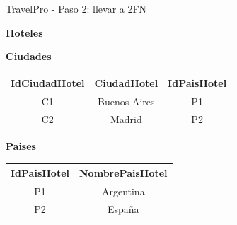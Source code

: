 \documentclass{beamer}
\begin{document}
\begin{frame}{TravelPro - Paso 2: llevar a 2FN}
    \begin{center}
    \textbf{Hoteles}\\[0.1cm]
    \vspace{0.4cm}

    \textbf{Ciudades}\\[0.1cm]
    \begin{tabular}{ccc}
        \hline
        IdCiudadHotel & CiudadHotel & IdPaisHotel \\
        \hline
        C1 & Buenos Aires & P1 \\
        C2 & Madrid & P2 \\
        \hline
    \end{tabular}
    \vspace{0.4cm}

    \textbf{Paises}\\[0.1cm]
    \begin{tabular}{cc}
        \hline
        IdPaisHotel & NombrePaisHotel \\
        \hline
        P1 & Argentina \\
        P2 & España \\
        \hline
    \end{tabular}
    \end{center}
\end{frame}
\end{document}

